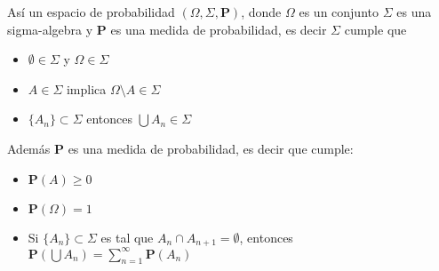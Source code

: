 \documentclass[letterpaper]{article}
\begin{document}
Así un espacio de probabilidad \((\Omega,\Sigma,\textbf{P})\), donde \(\Omega\) es un conjunto \(\Sigma\) es una sigma-algebra y \textbf{P} es una medida de probabilidad, es decir \(\Sigma\) cumple que

\begin{itemize}
\item \(\emptyset\in\Sigma\) y \(\Omega\in\Sigma\)
\item \(A\in\Sigma\) implica \(\Omega\setminus A\in\Sigma\)
\item \(\{A_n\}\subset\Sigma\) entonces \(\bigcup A_n\in\Sigma\)
\end{itemize}

Además \textbf{P} es una medida de probabilidad, es decir que cumple:

\begin{itemize}
\item \(\textbf{P}(A)\geq 0\)
\item \(\textbf{P}(\Omega)=1\)
\item Si \(\{A_n\}\subset\Sigma\) es tal que \(A_n\cap A_{n+1}=\emptyset\), entonces \(\textbf{P}(\bigcup A_n)=\sum_{n=1}^{\infty} \textbf{P}(A_n)\)
\end{itemize}
\end{document}
